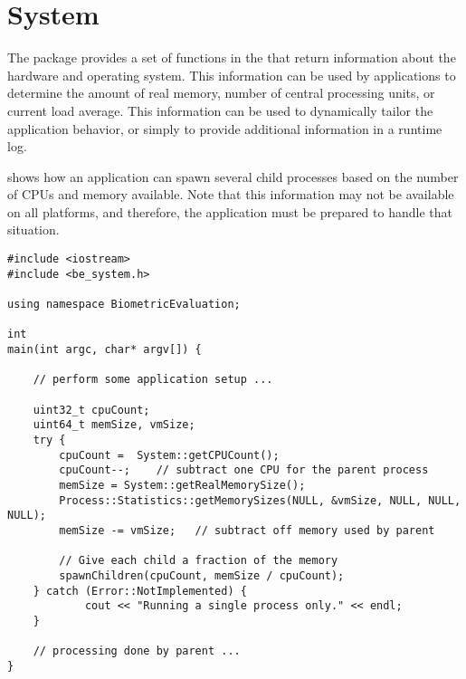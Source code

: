 %
%
\chapter{System}
\label{chp-system}
The  package provides a set of functions in the that
return information about the hardware and operating system. This information
can be used by applications to determine the amount of real memory, number of
central processing units, or current load average. This information can be
used to dynamically tailor the application behavior, or simply to provide
additional information in a runtime log.

 shows how an application can spawn several child
processes based on the number of CPUs and memory available. Note that this
information may not be available on all platforms, and therefore, the
application must be prepared to handle that situation.

\begin{lstlisting}[caption={Using the \namespace{System} CPU Count Information}, label=lst:cpucountuse]
#include <iostream>
#include <be_system.h>

using namespace BiometricEvaluation;

int
main(int argc, char* argv[]) {

    // perform some application setup ...

    uint32_t cpuCount;
    uint64_t memSize, vmSize;
    try {
        cpuCount =  System::getCPUCount();
        cpuCount--;    // subtract one CPU for the parent process
        memSize = System::getRealMemorySize();
        Process::Statistics::getMemorySizes(NULL, &vmSize, NULL, NULL, NULL);
        memSize -= vmSize;   // subtract off memory used by parent

        // Give each child a fraction of the memory
        spawnChildren(cpuCount, memSize / cpuCount);
    } catch (Error::NotImplemented) {
            cout << "Running a single process only." << endl;
    }

    // processing done by parent ...
}

\end{lstlisting}
